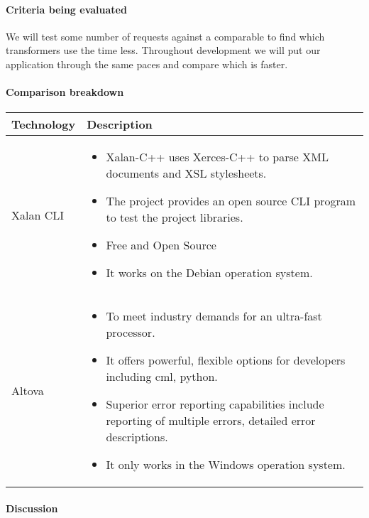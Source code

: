 \paragraph{Criteria being evaluated}

We will test some number of requests against a comparable to find which transformers use the time less.
Throughout development we will put our application through the same paces and compare which is faster.

\paragraph{Comparison breakdown}

\begin{center}
  \begin{tabular}{ | l | p{10cm} |}
    \hline
    Technology & Description  \\ \hline
    Xalan CLI \cite{Xalan-C} &
    \begin{itemize}
      \item Xalan-C++ uses Xerces-C++ to parse XML documents and XSL stylesheets.
      \item The project provides an open source CLI program to test the project libraries.
      \item Free and Open Source
      \item It works on the Debian operation system. 
    \end{itemize}\\ \hline
    Altova \cite{Altova} &
    \begin{itemize}
      \item To meet industry demands for an ultra-fast processor.
      \item It offers powerful, flexible options for developers including cml, python.
      \item Superior error reporting capabilities include reporting of multiple errors, detailed error descriptions.
      \item It only works in the Windows operation system. 
    \end{itemize} \\ \hline
  \end{tabular}
\end{center}

\paragraph{Discussion}

